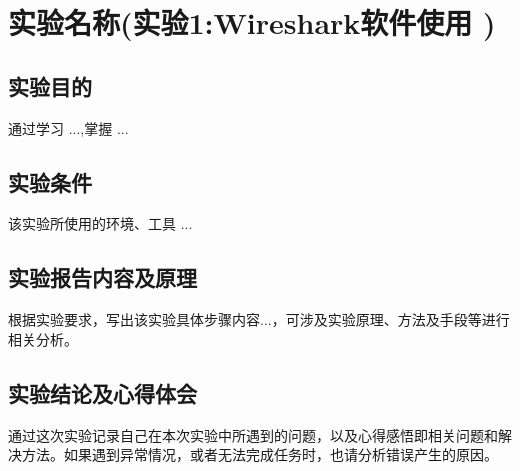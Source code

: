 \documentclass[a4paper,12pt]{report}
\begin{document}
\chapter*{实验名称(实验1:Wireshark软件使用
)}
\setcounter{page}{1}
\begin{spacing}{1.5}
\songti{}

\section{实验目的}
通过学习 ...,掌握 ...

\section{实验条件}
该实验所使用的环境、工具 ...

\section{实验报告内容及原理}
根据实验要求，写出该实验具体步骤内容...，可涉及实验原理、方法及手段等进行相关分析。


\section{实验结论及心得体会}
通过这次实验记录自己在本次实验中所遇到的问题，以及心得感悟即相关问题和解决方法。如果遇到异常情况，或者无法完成任务时，也请分析错误产生的原因。

\end{spacing}
\end{document}
